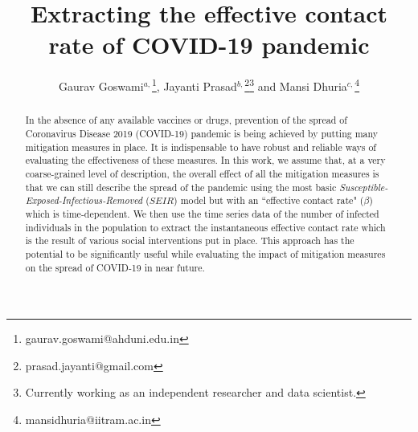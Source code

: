 \documentclass[aps,prd,10pt,twocolumn,nofootinbib]{revtex4-2}
\begin{document}
\title{Extracting the effective contact rate of COVID-19 pandemic}


\author{
Gaurav Goswami$^{a,}$\footnote{gaurav.goswami@ahduni.edu.in},
Jayanti Prasad$^{b,}$\footnote{prasad.jayanti@gmail.com}\footnote{Currently working as an independent researcher and data scientist.} and
Mansi Dhuria$^{c,}$\footnote{mansidhuria@iitram.ac.in}
}


\begin{abstract}
\noindent In the absence of any available vaccines or drugs, prevention of the spread of Coronavirus Disease 2019 (COVID-19) pandemic is being achieved by putting many mitigation measures in place.
It is indispensable to have robust and reliable ways of evaluating the effectiveness of these measures.
In this work, we assume that, at a very coarse-grained level of description, the overall effect of all the mitigation measures is that we can still describe the spread of the pandemic using the most basic {\it Susceptible-Exposed-Infectious-Removed} ($SEIR$) model but with an ``effective contact rate" ($\beta$) which is time-dependent. 
We then use the time series data of the number of infected individuals in the population to extract the instantaneous effective contact rate which is the result of various social interventions put in place. 
This approach has the potential to be significantly useful while evaluating the impact of mitigation measures on the spread of COVID-19 in near future. 
\end{abstract}

\maketitle
\end{document}
